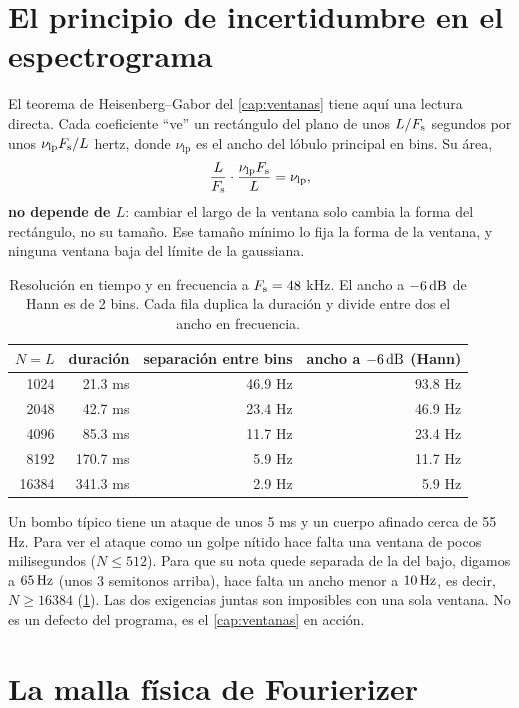 \section{El principio de incertidumbre en el espectrograma}

El teorema de Heisenberg–Gabor del \cref{cap:ventanas} tiene aquí una lectura directa. Cada
coeficiente ``ve'' un rectángulo del plano de unos $L/F_{\mathrm{s}}$ segundos por unos
$\nu_{\text{lp}}F_{\mathrm{s}}/L$ hertz, donde $\nu_{\text{lp}}$ es el ancho del lóbulo principal en bins.
Su área,
\[
  \frac{L}{F_{\mathrm{s}}}\cdot\frac{\nu_{\text{lp}}F_{\mathrm{s}}}{L}=\nu_{\text{lp}},
\]
\textbf{no depende de $L$}: cambiar el largo de la ventana solo cambia la forma del rectángulo,
no su tamaño. Ese tamaño mínimo lo fija la forma de la ventana, y ninguna ventana baja del límite
de la gaussiana.

\begin{table}[ht]
\centering\small
\begin{tabular}{rrrr}
\toprule
$N=L$ & duración & separación entre bins & ancho a $-6\,\mathrm{dB}$ (Hann) \\
\midrule
1024  & 21.3 ms  & 46.9 Hz & 93.8 Hz \\
2048  & 42.7 ms  & 23.4 Hz & 46.9 Hz \\
4096  & 85.3 ms  & 11.7 Hz & 23.4 Hz \\
8192  & 170.7 ms & 5.9 Hz  & 11.7 Hz \\
16384 & 341.3 ms & 2.9 Hz  & 5.9 Hz \\
\bottomrule
\end{tabular}
\caption{Resolución en tiempo y en frecuencia a $F_{\mathrm{s}}=48$ kHz. El ancho a $-6\,\mathrm{dB}$ de Hann es de
2 bins. Cada fila duplica la duración y divide entre dos el ancho en frecuencia.}
\label{tab:resolucion}
\end{table}

\begin{ejemplo}
Un bombo típico tiene un ataque de unos 5 ms y un cuerpo afinado cerca de 55 Hz. Para ver el
ataque como un golpe nítido hace falta una ventana de pocos milisegundos ($N\le512$). Para que su
nota quede separada de la del bajo, digamos a $65\,\mathrm{Hz}$ (unos 3 semitonos arriba), hace falta un
ancho menor a $10\,\mathrm{Hz}$, es decir, $N\ge 16384$ (\cref{tab:resolucion}). Las dos exigencias juntas
son imposibles con una sola ventana. No es un defecto del programa, es el
\cref{cap:ventanas} en acción.
\end{ejemplo}

\section{La malla física de Fourierizer}

